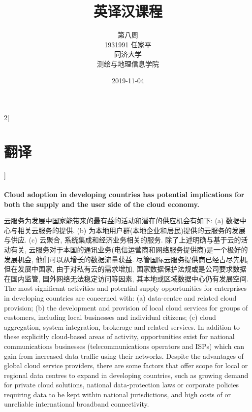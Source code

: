 \documentclass[a4paper, UTF8, 12pt]{article}
\begin{document}
\title{\Huge 英译汉课程}
\author{\Large 
        第八周 \\[12pt]
        1931991 任家平 \\[12pt]
        同济大学 \\[12pt]
        测绘与地理信息学院}
\date{2019-11-04}

\maketitle

\thispagestyle{empty}

\newpage
{}
\tableofcontents
{}

\newpage
{}

\begin{paracol}{2}[\section{翻译}]

    \switchcolumn*
    \paragraph{} 
    \switchcolumn
    \paragraph{}
    {\bfseries Cloud adoption in developing countries has potential implications for both the supply and the user side of the cloud economy.} 
    
    \switchcolumn*
    云服务为发展中国家能带来的最有益的活动和潜在的供应机会有如下: (a) 数据中心与相关云服务的提供. (b) 为本地用户群(本地企业和居民)提供的云服务的发展与供应. (c) 云聚合, 系统集成和经济业务相关的服务. 除了上述明确与基于云的活动有关, 云服务对于本国的通讯业务(电信运营商和网络服务提供商)是一个极好的发展机会, 他们可以从增长的数据流量获益. 尽管国际云服务提供商已经占尽先机, 但在发展中国家, 由于对私有云的需求增加, 国家数据保护法规或是公司要求数据在国内监管, 国外网络无法稳定访问等因素, 其本地或区域数据中心仍有发展空间.
    \switchcolumn
    The most significant activities and potential supply opportunities for enterprises in developing countries are concerned with: (a) data-centre and related cloud provision; (b) the development and provision of local cloud services for groups of customers, including local businesses and individual citizens; (c) cloud aggregation, system integration, brokerage and related services. In addition to these explicitly cloud-based areas of activity, opportunities exist for national communications businesses (telecommunications operators and ISPs) which can gain from increased data traffic using their networks. Despite the advantages of global cloud service providers, there are some factors that offer scope for local or regional data centres to expand in developing countries, such as growing demand for private cloud solutions, national data-protection laws or corporate policies requiring data to be kept within national jurisdictions, and high costs of or unreliable international broadband connectivity. 


\end{paracol}
\end{document}
